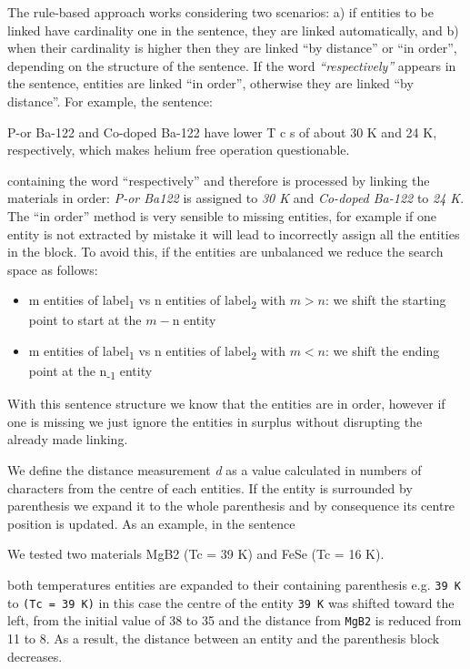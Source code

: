 \documentclass{article}
\begin{document}
The rule-based approach works considering two scenarios: a) if entities to be linked have cardinality one in the sentence, they are linked automatically, and b) when their cardinality is higher then they are linked ``by distance'' or ``in order'', depending on the structure of the sentence. 
If the word \textit{``respectively''} appears in the sentence, entities are linked ``in order'', otherwise they are linked ``by distance''. 
For example, the sentence:  
\begin{displayquote}
P-or Ba-122  and Co-doped Ba-122 have lower T c s of about 30 K and 24 K, respectively, which makes helium free operation questionable.
\end{displayquote}
containing the word ``respectively'' and therefore is processed by linking the materials in order: \textit{P-or Ba122} is assigned to \textit{30 K} and \textit{Co-doped Ba-122} to \textit{24 K}.
The ``in order'' method is very sensible to missing entities, for example if one entity is not extracted by mistake it will lead to incorrectly assign all the entities in the block. To avoid this, if the entities are unbalanced we reduce the search space as follows: 
\begin{itemize}
    \item m entities of label\textsubscript{1} vs n entities of label\textsubscript{2} with $m > n$: we shift the starting point to start at the $m - $n entity 
    \item m entities of label\textsubscript{1} vs n entities of label\textsubscript{2} with $m < n$: we shift the ending point at the n\textsubscript{-1} entity
\end{itemize}

With this sentence structure we know that the entities are in order, however if one is missing we just ignore the entities in surplus without disrupting the already made linking. 

We define the distance measurement \textit{d} as a value calculated in numbers of characters from the centre of each entities. 
If the entity is surrounded by parenthesis we expand it to the whole parenthesis and by consequence its centre position is updated. 
As an example, in the sentence
\begin{displayquote}
We tested two materials MgB2 (Tc = 39 K) and FeSe (Tc = 16 K).
\end{displayquote}
both temperatures entities are expanded to their containing parenthesis e.g. \texttt{39 K} to \texttt{(Tc = 39 K)} in this case the centre of the entity \texttt{39 K} was shifted toward the left, from the initial value of 38 to 35 and the distance from \texttt{MgB2} is reduced from 11 to 8.
As a result, the distance between an entity and the parenthesis block decreases. 
\end{document}
